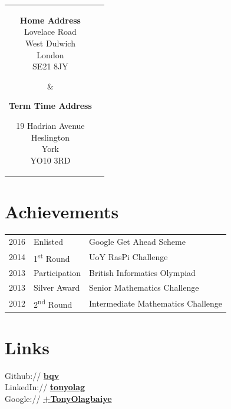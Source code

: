 \documentclass[11pt, a4paper]{cv}
\begin{document}
\begin{minipage}[t]{0.8\textwidth}

\newpage

\vspace{2em}

\center
\begin{tabular}{c  c}
\parbox{0.33\textwidth}{
\center\textbf{Home Address} \\
\sectionspace
{} Lovelace Road \\
West Dulwich \\
London \\
SE21 8JY}
& 
\parbox{0.33\textwidth}{
\center\textbf{Term Time Address} \\
\sectionspace
\raggedright
19 Hadrian Avenue \\
Heslington \\
York \\
YO10 3RD}
\end{tabular}

\sectionspace %

\section{Achievements} 

\begin{tabular}{rll}
2016 & Enlisted & Google Get Ahead Scheme \\
2014	 & 1\textsuperscript{st} Round & UoY RasPi Challenge\\
2013 & Participation & British Informatics Olympiad \\
2013 & Silver Award & Senior Mathematics Challenge \\
2012 & 2\textsuperscript{nd} Round & Intermediate Mathematics Challenge \\
\end{tabular}

\sectionspace %

\section{Links} 

\faGithub{} Github:// \href{https://github.com/bqv}{\bf bqv} \\
\faLinkedin{} LinkedIn:// \href{https://www.linkedin.com/in/tonyolag}{\bf tonyolag} \\
\faGooglePlus{} Google:// \href{https://plus.google.com/+TonyOlagbaiye}{\bf +TonyOlagbaiye}


\end{minipage}
\end{document}
